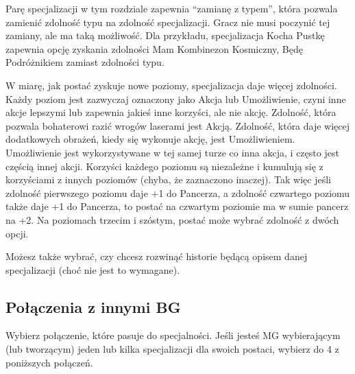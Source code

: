 Parę specjalizacji w tym rozdziale zapewnia “zamianę z typem”, która pozwala zamienić zdolność typu na zdolność specjalizacji. Gracz nie musi poczynić tej zamiany, ale ma taką możliwość. Dla przykładu, specjalizacja Kocha Pustkę zapewnia opcję zyskania zdolności Mam Kombinezon Kosmiczny, Będę Podróżnikiem zamiast zdolności typu.

W miarę, jak postać zyskuje nowe poziomy, specjalizacja daje więcej zdolności. Każdy poziom jest zazwyczaj oznaczony jako Akcja lub Umożliwienie, czyni inne akcje lepszymi lub zapewnia jakieś inne korzyści, ale nie akcję. Zdolność, która pozwala bohaterowi razić wrogów laserami jest Akcją. Zdolność, która daje więcej dodatkowych obrażeń, kiedy się wykonuje akcję, jest Umożliwieniem. Umożliwienie jest wykorzystywane w tej samej turze co inna akcja, i często jest częścią innej akcji. Korzyści każdego poziomu są niezależne i kumulują się z korzyściami z innych poziomów (chyba, że zaznaczono inaczej). Tak więc jeśli zdolność pierwszego poziomu daje +1 do Pancerza, a zdolność czwartego poziomu także daje +1 do Pancerza, to postać na czwartym poziomie ma w sumie pancerz na +2.
Na poziomach trzecim i szóstym, postać może wybrać zdolność z dwóch opcji.

Możesz także wybrać, czy chcesz rozwinąć historie będącą opisem danej specjalizacji (choć nie jest to wymagane).

\subsection{Połączenia z innymi BG}

Wybierz połączenie, które pasuje do specjalności. Jeśli jesteś MG wybierającym (lub tworzącym) jeden lub kilka specjalizacji dla swoich postaci, wybierz do 4 z poniższych połączeń.

